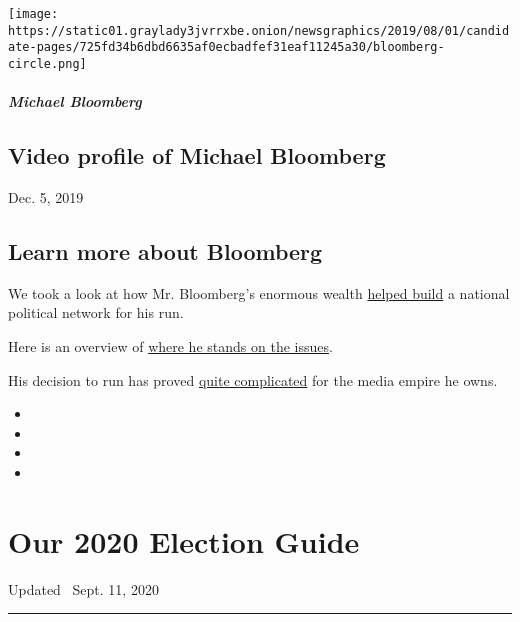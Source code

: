 \texttt{[image: https://static01.graylady3jvrrxbe.onion/newsgraphics/2019/08/01/candidate-pages/725fd34b6dbd6635af0ecbadfef31eaf11245a30/bloomberg-circle.png]}

\hypertarget{michael-bloomberg-1}{%
\subparagraph{Michael Bloomberg}\label{michael-bloomberg-1}}

\hypertarget{video-profile-of-michael-bloomberg}{%
\subsection{Video profile of Michael
Bloomberg}\label{video-profile-of-michael-bloomberg}}

Dec. 5, 2019

\hypertarget{learn-more-about-bloomberg}{%
\subsection{Learn more about
Bloomberg}\label{learn-more-about-bloomberg}}

We took a look at how Mr. Bloomberg's enormous wealth
\href{https://www.nytimes3xbfgragh.onion/2019/12/14/us/politics/bloomberg-mayors-2020.html}{helped
build} a national political network for his run.

Here is an overview of
\href{https://www.nytimes3xbfgragh.onion/2019/11/08/us/politics/michael-bloomberg-issues.html}{where
he stands on the issues}.

His decision to run has proved
\href{https://www.nytimes3xbfgragh.onion/2019/11/24/business/bloomberg-media-presidential-campaign.html}{quite
complicated} for the media empire he owns.

\begin{itemize}
\item
\item
\item
\item
\end{itemize}

\hypertarget{our-2020-election-guide}{%
\section{Our 2020 Election Guide}\label{our-2020-election-guide}}

Updated ~Sept. 11, 2020

\begin{center}\rule{0.5\linewidth}{\linethickness}\end{center}

